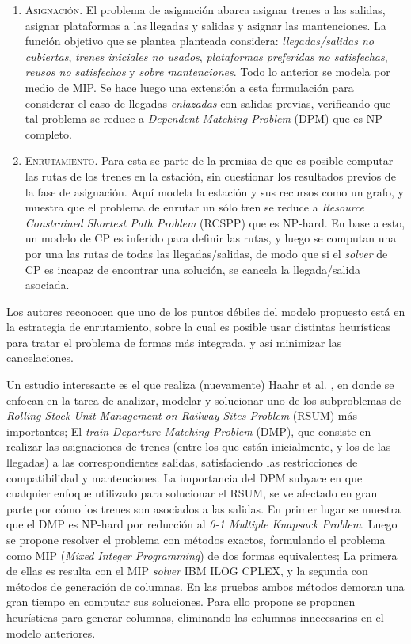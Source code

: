 \documentclass[letter, 10pt]{article}
\begin{document}
\begin{description}
    \begin{enumerate}
        \item \textsc{Asignación.} El problema de asignación abarca asignar trenes a las salidas, asignar plataformas a las llegadas y salidas y asignar las mantenciones. La función objetivo que se plantea planteada considera: \textit{llegadas/salidas no cubiertas}, \textit{trenes iniciales no usados}, \textit{plataformas preferidas no satisfechas}, \textit{reusos no satisfechos} y \textit{sobre mantenciones}. Todo lo anterior se modela por medio de MIP. Se hace luego una extensión a esta formulación para considerar el caso de llegadas \textit{enlazadas} con salidas previas, verificando que tal problema se reduce a \textit{Dependent Matching Problem} (DPM) que es NP-completo.  
        \item \textsc{Enrutamiento.} Para esta se parte de la premisa de que es posible computar las rutas de los trenes en la estación, sin cuestionar los resultados previos de la fase de asignación. Aquí modela la estación y sus recursos como un grafo, y muestra que el problema de enrutar un sólo tren se reduce a \textit{Resource Constrained Shortest Path Problem} (RCSPP) que es NP-hard. En base a esto, un modelo de CP es inferido para definir las rutas, y luego se computan una por una las rutas de todas las llegadas/salidas, de modo que si el \textit{solver} de CP es incapaz de encontrar una solución, se cancela la llegada/salida asociada.
    \end{enumerate}
    Los autores reconocen que uno de los puntos débiles del modelo propuesto está en la estrategia de enrutamiento, sobre la cual es posible usar distintas heurísticas para tratar el problema de formas más integrada, y así minimizar las cancelaciones.

    Un estudio interesante es el que realiza (nuevamente) Haahr et al. \cite{Haahr}, en donde se enfocan en la tarea de analizar, modelar y solucionar uno de los subproblemas de \textit{Rolling Stock Unit Management on Railway Sites Problem} (RSUM) más importantes; El \textit{train Departure Matching Problem} (DMP), que consiste en realizar las asignaciones de trenes (entre los que están inicialmente, y los de las llegadas) a las correspondientes salidas, satisfaciendo las restricciones de compatibilidad y mantenciones. La importancia del DPM subyace en que cualquier enfoque utilizado para solucionar el RSUM, se ve afectado en gran parte por cómo los trenes son asociados a las salidas. En primer lugar se muestra que el DMP es NP-hard por reducción al \textit{0-1 Multiple Knapsack Problem}. Luego se propone resolver el problema con métodos exactos, formulando el problema como MIP (\textit{Mixed Integer Programming}) de dos formas equivalentes; La primera de ellas es resulta con el MIP \textit{solver} IBM ILOG CPLEX, y la segunda con métodos de generación de columnas. En las pruebas ambos métodos demoran una gran tiempo en computar sus soluciones. Para ello propone se proponen heurísticas para generar columnas, eliminando las columnas innecesarias en el modelo anteriores.


\end{description}
\end{document}
